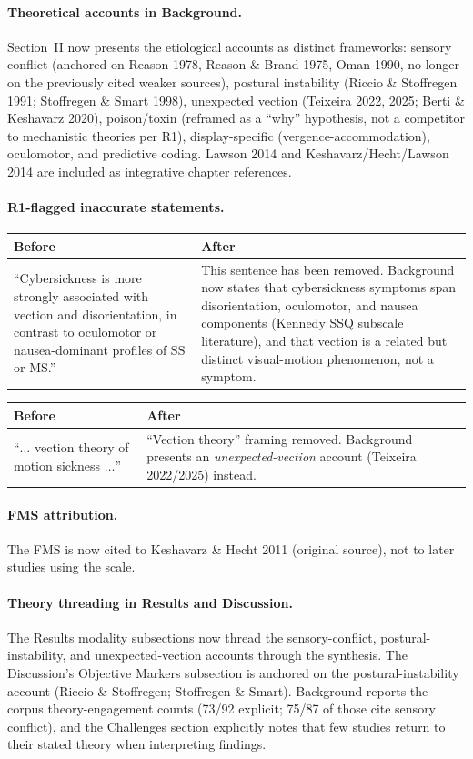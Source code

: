 \documentclass[11pt,a4paper]{article}
\makeatletter
\newcommand{\diffbox}[2]{%
  \begin{center}
  \small
  \begin{tabular}{@{}p{0.46\textwidth}@{\hspace{2em}}p{0.46\textwidth}@{}}
  \toprule
  \textbf{Before} & \textbf{After} \\
  \midrule
  #1 & #2 \\
  \bottomrule
  \end{tabular}
  \end{center}}
\makeatother
\begin{document}
\paragraph{Theoretical accounts in Background.} Section~II now presents the etiological accounts as distinct frameworks: sensory conflict (anchored on Reason 1978, Reason \& Brand 1975, Oman 1990, no longer on the previously cited weaker sources), postural instability (Riccio \& Stoffregen 1991; Stoffregen \& Smart 1998), unexpected vection (Teixeira 2022, 2025; Berti \& Keshavarz 2020), poison/toxin (reframed as a ``why'' hypothesis, not a competitor to mechanistic theories per R1), display-specific (vergence-accommodation), oculomotor, and predictive coding. Lawson 2014 and Keshavarz/Hecht/Lawson 2014 are included as integrative chapter references.

\paragraph{R1-flagged inaccurate statements.}
\diffbox{``Cybersickness is more strongly associated with vection and disorientation, in contrast to oculomotor or nausea-dominant profiles of SS or MS.''}{This sentence has been removed. Background now states that cybersickness symptoms span disorientation, oculomotor, and nausea components (Kennedy SSQ subscale literature), and that vection is a related but distinct visual-motion phenomenon, not a symptom.}
\diffbox{``$\ldots$ vection theory of motion sickness $\ldots$''}{``Vection theory'' framing removed. Background presents an \emph{unexpected-vection} account (Teixeira 2022/2025) instead.}

\paragraph{FMS attribution.} The FMS is now cited to Keshavarz \& Hecht 2011 (original source), not to later studies using the scale.

\paragraph{Theory threading in Results and Discussion.} The Results modality subsections now thread the sensory-conflict, postural-instability, and unexpected-vection accounts through the synthesis. The Discussion's Objective Markers subsection is anchored on the postural-instability account (Riccio \& Stoffregen; Stoffregen \& Smart). Background reports the corpus theory-engagement counts (73/92 explicit; 75/87 of those cite sensory conflict), and the Challenges section explicitly notes that few studies return to their stated theory when interpreting findings.
\end{document}
